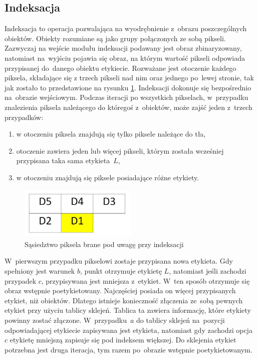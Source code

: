 \subsection{Indeksacja}
\label{subsec:indeksacja}


Indeksacja to operacja pozwalająca na wyodrębnienie z~obrazu poszczególnych obiektów. 
Obiekty rozumiane są jako grupy połączonych ze sobą pikseli. 
Zazwyczaj na wejście modułu indeksacji podawany jest obraz zbinaryzowany, natomiast na~wyjściu pojawia się obraz, na którym  wartość  pikseli odpowiada przypisanej do~danego obiektu etykiecie. 
Rozważane jest otoczenie każdego piksela, składające się z trzech pikseli nad nim oraz jednego po~lewej stronie, tak jak zostało to przedstawione na rysunku \ref{fig:ind_sasiedztwo}. 
Indeksacji dokonuje się bezpośrednio na~obrazie wejściowym. 
Podczas iteracji po wszystkich pikselach, w~przypadku znalezienia piksela należącego do któregoś z~obiektów, może zajść jeden z~trzech przypadków:
\begin{enumerate}[label=(\alph*)]
	\item w otoczeniu piksela znajdują się tylko piksele należące do tła,
	\item otoczenie zawiera jeden lub więcej pikseli, którym została wcześniej przypisana taka sama etykieta~$L$,
	\item w otoczeniu znajdują się piksele posiadające różne etykiety.
\end{enumerate} 
\begin{figure}[h]
	\centering
	\includegraphics[width=0.5\textwidth]{ind_sasiedztwo.jpg}
	\caption{Sąsiedztwo piksela brane pod uwagę przy indeksacji}
	\label{fig:ind_sasiedztwo}
\end{figure}

W~pierwszym przypadku pikselowi zostaje przypisana nowa etykieta. 
Gdy spełniony jest warunek $b$, punkt otrzymuje etykietę $L$, natomiast jeśli zachodzi przypadek $c$, przypisywana jest mniejsza z~etykiet. 
W~ten sposób otrzymuje się obraz wstępnie poetykietowany. 
Najczęściej posiada on więcej przypisanych etykiet, niż obiektów. 
Dlatego istnieje konieczność złączenia ze~sobą pewnych etykiet przy użyciu tablicy sklejeń. 
Tablica ta zawiera informację, które etykiety powinny zostać złączone. 
W~przypadku~$a$ do tablicy sklejeń na~pozycji odpowiadającej etykiecie zapisywana jest etykieta, natomiast gdy zachodzi opcja~$c$ etykietę mniejszą zapisuje się pod indeksem większej. 
Do sklejenia etykiet potrzebna jest druga iteracja, tym razem po~obrazie wstępnie poetykietowanym.\\

